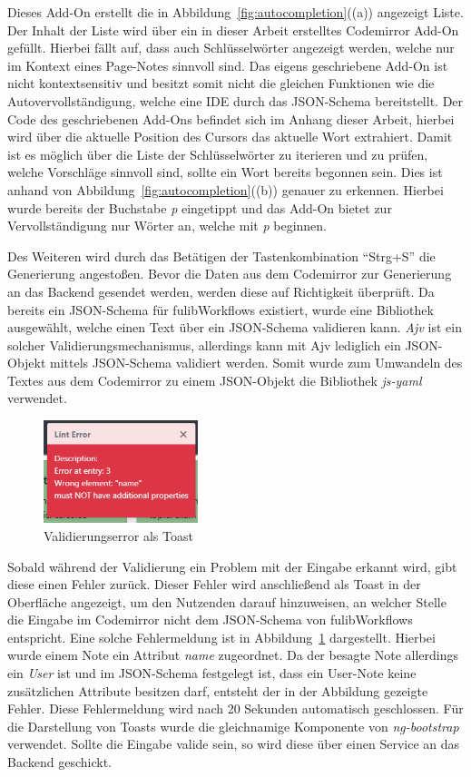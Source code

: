 Dieses Add-On erstellt die in Abbildung~\ref{fig:autocompletion}((a)) angezeigt Liste.
Der Inhalt der Liste wird über ein in dieser Arbeit erstelltes Codemirror Add-On gefüllt.
Hierbei fällt auf, dass auch Schlüsselwörter angezeigt werden, welche nur im Kontext eines Page-Notes sinnvoll sind.
Das eigens geschriebene Add-On ist nicht kontextsensitiv und besitzt somit nicht die gleichen Funktionen wie die Autovervollständigung, welche eine IDE durch das JSON-Schema bereitstellt.
Der Code des geschriebenen Add-Ons befindet sich im Anhang dieser Arbeit, hierbei wird über die aktuelle Position des Cursors das aktuelle Wort extrahiert.
Damit ist es möglich über die Liste der Schlüsselwörter zu iterieren und zu prüfen, welche Vorschläge sinnvoll sind, sollte ein Wort bereits begonnen sein.
Dies ist anhand von Abbildung~\ref{fig:autocompletion}((b)) genauer zu erkennen.
Hierbei wurde bereits der Buchstabe \textit{p} eingetippt und das Add-On bietet zur Vervollständigung nur Wörter an, welche mit \textit{p} beginnen.

Des Weiteren wird durch das Betätigen der Tastenkombination ``Strg+S'' die Generierung angestoßen.
Bevor die Daten aus dem Codemirror zur Generierung an das Backend gesendet werden, werden diese auf Richtigkeit überprüft.
Da bereits ein JSON-Schema für fulibWorkflows existiert, wurde eine Bibliothek ausgewählt, welche einen Text über ein JSON-Schema validieren kann.
\textit{Ajv} ist ein solcher Validierungsmechanismus, allerdings kann mit Ajv lediglich ein JSON-Objekt mittels JSON-Schema validiert werden\cite*{ajv}.
Somit wurde zum Umwandeln des Textes aus dem Codemirror zu einem JSON-Objekt die Bibliothek \textit{js-yaml} verwendet\cite*{js-yaml}.

\begin{figure}[h]
    \centering
    \includegraphics[width=0.4\textwidth]{images/3.2/error-toast}
    \caption{Validierungserror als Toast}
    \label{fig:error-toast}
\end{figure}

Sobald während der Validierung ein Problem mit der Eingabe erkannt wird, gibt diese einen Fehler zurück.
Dieser Fehler wird anschließend als Toast in der Oberfläche angezeigt, um den Nutzenden darauf hinzuweisen, an welcher Stelle die Eingabe im Codemirror nicht
dem JSON-Schema von fulibWorkflows entspricht.
Eine solche Fehlermeldung ist in Abbildung~\ref{fig:error-toast} dargestellt.
Hierbei wurde einem Note ein Attribut \textit{name} zugeordnet.
Da der besagte Note allerdings ein \textit{User} ist und im JSON-Schema festgelegt ist, dass ein User-Note keine zusätzlichen Attribute
besitzen darf, entsteht der in der Abbildung gezeigte Fehler.
Diese Fehlermeldung wird nach 20 Sekunden automatisch geschlossen.
Für die Darstellung von Toasts wurde die gleichnamige Komponente von \textit{ng-bootstrap} verwendet.
Sollte die Eingabe valide sein, so wird diese über einen Service an das Backend geschickt.

